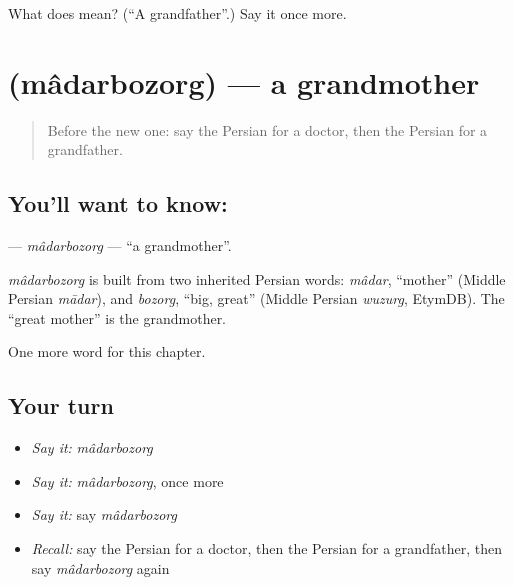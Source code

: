 \begin{tcolorbox}[breakable,colback=teal!4,colframe=teal!35!black,title={Before you move on}]
What does  mean? (\textquotedblleft{}A grandfather\textquotedblright{}.) Say it once more.
\end{tcolorbox}
\section[\texorpdfstring{\fa{مادربزرگ} (mâdarbozorg)}{مادربزرگ (mâdarbozorg)}]{ (mâdarbozorg) — a grandmother}

\label{lesson:FA-C32-madarbozorg}



\begin{quote}
Before the new one: say the Persian for a doctor, then the Persian for a grandfather.
\end{quote}

\subsection*{You'll want to know: }
\textbf{} — \emph{mâdarbozorg} — \textquotedblleft{}a grandmother\textquotedblright{}.

\begin{cousinweb}
\emph{mâdarbozorg} is built from two inherited Persian words: \emph{mâdar}, \textquotedblleft{}mother\textquotedblright{} (Middle Persian \emph{mādar}), and \emph{bozorg}, \textquotedblleft{}big, great\textquotedblright{} (Middle Persian \emph{wuzurg}, EtymDB). The \textquotedblleft{}great mother\textquotedblright{} is the grandmother.
\end{cousinweb}

\begin{grammarlens}[title={What you've built}]
One more word for this chapter.
\end{grammarlens}

\subsection*{Your turn}
\begin{itemize}
\raggedright
  \item \emph{Say it:} \emph{mâdarbozorg}
  \item \emph{Say it:} \emph{mâdarbozorg}, once more
  \item \emph{Say it:} say \emph{mâdarbozorg}
  \item \emph{Recall:} say the Persian for a doctor, then the Persian for a grandfather, then say \emph{mâdarbozorg} again
\end{itemize}


